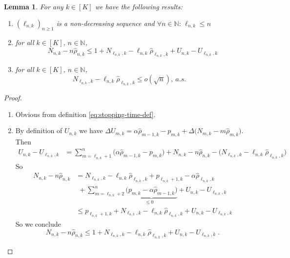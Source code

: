 \documentclass[11pt]{article}
\theoremstyle{plain}
\newtheorem{lemma}[theorem]{Lemma}
\theoremstyle{definition}
\begin{document}
\begin{appendix}
\begin{lemma}\label{lem:preliminary}
	For any \(k \in [K]\) we have the following results:
	\begin{enumerate}[label=(\roman*)]
		\item \(\left(\ell_{n,k}\right)_{n \geq 1}\) is a non-decreasing sequence and \(\forall n \in \mathbb{N}: \,\ell_{n,k} \leq n\)
		\item for all $k\in [K]$, $n \in \mathbb{N}$,\begin{equation}\label{eq:prelim-4}
			N_{n,k} - n\hat{\rho}_{n,k} \leq 1+N_{\ell_{n,k},k} - \ell_{n,k} \hat{\rho}_{\ell_{n,k},k} + U_{n,k} - U_{\ell_{n,k},k}	
		\end{equation}
		\item for all $k\in [K]$, $n \in \mathbb{N}$,
		\begin{equation}\label{eq:condition}
			N_{\ell_{n,k},k} - \ell_{n,k} \hat{\rho}_{\ell_{n,k},k} \leq o(\sqrt{n}), \ a.s.
			\quad 
		\end{equation}
	\end{enumerate}
\end{lemma}
\begin{proof}
	\begin{enumerate}[label=(\roman*)]
		\item Obvious from definition \eqref{eq:stopping-time-def}.
		\item By definition of \(U_{n,k}\) we have \(\Delta U_{m,k} = \alpha \hat{\rho}_{m-1,k} - p_{m,k} 
		+ \Delta \Big( N_{m,k} - m \hat{\rho}_{m,k} \Big)\).
%						
		Then 
		\begin{align*}
			U_{n,k} - U_{\ell_{n,k},k}
			&= \sum_{m=\ell_{n,k}+1}^n \Big( \alpha \hat{\rho}_{m-1,k} - p_{m,k} \Big)
			+ N_{n,k} - n \hat{\rho}_{n,k}
			- \Big( N_{\ell_{n,k},k} - \ell_{n,k} \hat{\rho}_{\ell_{n,k},k} \Big)
		\end{align*}
		So 
		\begin{align*}
			N_{n,k} - n \hat{\rho}_{n,k}
			&= N_{\ell_{n,k},k} - \ell_{n,k} \hat{\rho}_{\ell_{n,k},k}
			+ p_{\ell_{n,k}+1,k} - \alpha \hat{\rho}_{\ell_{n,k},k} \\&\,\,+ \sum_{m=\ell_{n,k}+2}^n \underbrace{\Big( p_{m,k} - \alpha \hat{\rho}_{m-1,k} \Big)}_{\leq 0 \quad}
			+ U_{n,k} - U_{\ell_{n,k}, k}\\					
			&\leq p_{\ell_{n,k}+1,k} + N_{\ell_{n,k},k} - \ell_{n,k} \hat{\rho}_{\ell_{n,k},k}
			+ U_{n,k} - U_{\ell_{n,k}, k}
		\end{align*}
		So we conclude 	
		\[N_{n,k} - n\hat{\rho}_{n,k} \leq 1 + N_{\ell_{n,k},k} - \ell_{n,k} \hat{\rho}_{\ell_{n,k},k} + U_{n,k} - U_{\ell_{n,k},k}\;.\]
		

\end{enumerate}
\end{proof}
\end{appendix}
\end{document}
